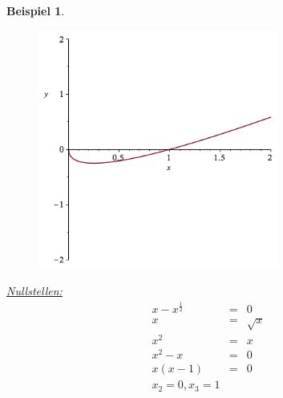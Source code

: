\documentclass{report}
\newtheorem{myexample}{Beispiel}
\begin{document}
\begin{myexample}
\begin{enumerate}
\begin{figure}[ht]
			\centering
			\includegraphics[width=0.7\textwidth]{images/x-sqrt(x).png}
		\end{figure}
		\underline{Nullstellen:}
		\begin{eqnarray*}
			x -x^{\frac{1}{2}} &=& 0\\
			x &=& \sqrt{x}\\
			x^2 &=& x\\
			x^2-x &=& 0\\
			x(x-1) &=& 0\\
			x_2 = 0, x_3 = 1
		\end{eqnarray*}
	\end{enumerate}
\end{myexample}
\newpage
\end{document}
